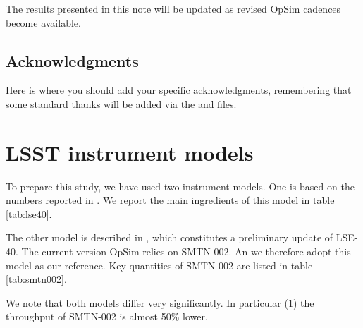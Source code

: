 \documentclass[\docopts]{\docclass}
\begin{document}
The results presented in this note will be updated as revised OpSim
cadences become available.



\subsection*{Acknowledgments}

Here is where you should add your specific acknowledgments, remembering that some standard thanks will be added via the  and  files.












\appendix

\section{LSST instrument models}
\label{sec:lsst_instrument_models}

To prepare this study, we have used two instrument models.  One is
based on the numbers reported in \cite[][LSE-40 hereafter]{LSE-40}.
We report the main ingredients of this model in table \ref{tab:lse40}. 

The other model is described in \cite[][hereafter
SMTN-002)]{SMTN-002}, which constitutes a preliminary update of
LSE-40.  The current version OpSim relies on SMTN-002. An we therefore
adopt this model as our reference. Key quantities of SMTN-002 are
listed in table \ref{tab:smtn002}.

We note that both models differ very significantly. In particular (1)
the throughput of SMTN-002 is almost 50\% lower.
\end{document}

